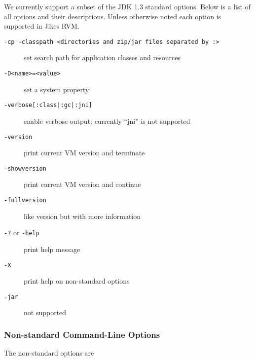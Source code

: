 We currently support a subset of the JDK 1.3 standard options.  Below
is a list of all options and their descriptions.  Unless otherwise noted each
option is supported in Jikes RVM.
\begin{description}
\item[{\tt -cp -classpath <directories and zip/jar files separated by :>}]
set search path for application classes and resources

\item[{\tt -D<name>=<value>}] set a system property

\item[{\tt -verbose[:class|:gc|:jni]}]
enable verbose output; currently ``jni'' is not supported

\item[{\tt -version}] print current VM version and terminate

\item[{\tt -showversion}] print current VM version and continue

\item[{\tt -fullversion}] like version but with more information

\item[{\tt -?} or {\tt -help}] print help message

\item[{\tt -X}] print help on non-standard options

\item[{\tt -jar}] not supported

\end{description}

\subsubsection{Non-standard Command-Line Options}

The non-standard options are

